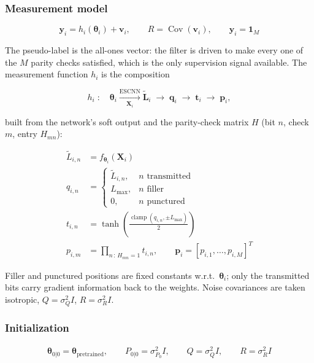 \documentclass{article}
\newcommand{\state}{\boldsymbol{\theta}}
\newcommand{\clamp}{\operatorname{clamp}}
\begin{document}
\subsubsection*{Measurement model}

\begin{equation}
\mathbf{y}_i = h_i(\state_i) + \mathbf{v}_i, \qquad R = \operatorname{Cov}(\mathbf{v}_i), \qquad
\mathbf{y}_i = \mathbf{1}_M
\end{equation}

The pseudo-label is the all-ones vector: the filter is driven to make every one of the $M$
parity checks satisfied, which is the only supervision signal available. The measurement
function $h_i$ is the composition

\begin{equation}
h_i \; : \quad \state_i \xrightarrow[\mathbf{X}_i]{\text{ESCNN}} \widetilde{\mathbf{L}}_i
\;\to\; \mathbf{q}_i \;\to\; \mathbf{t}_i \;\to\; \mathbf{p}_i ,
\end{equation}

built from the network's soft output and the parity-check matrix $H$ (bit $n$, check $m$,
entry $H_{mn}$):

\begin{align}
\widetilde{L}_{i,n} &= f_{\state_i}(\mathbf{X}_i) \label{eq:llr} \\[4pt]
q_{i,n} &=
\begin{cases}
\widetilde{L}_{i,n}, & n \text{ transmitted} \\
L_{\max}, & n \text{ filler} \\
0, & n \text{ punctured}
\end{cases} \\[4pt]
t_{i,n} &= \tanh\!\left(\frac{\clamp(q_{i,n}, \pm L_{\max})}{2}\right) \label{eq:t} \\[4pt]
p_{i,m} &= \prod_{n \,:\, H_{mn}=1} t_{i,n}, \qquad
\mathbf{p}_i = [p_{i,1}, \dots, p_{i,M}]^T \label{eq:p}
\end{align}

Filler and punctured positions are fixed constants w.r.t.\ $\state_i$; only the transmitted
bits carry gradient information back to the weights. Noise covariances are taken isotropic,
$Q = \sigma_Q^2 I$, $R = \sigma_R^2 I$.

\subsubsection*{Initialization}

\begin{equation}
\hat{\state}_{0|0} = \state_{\text{pretrained}}, \qquad
P_{0|0} = \sigma_{P_0}^2 I, \qquad
Q = \sigma_Q^2 I, \qquad
R = \sigma_R^2 I
\end{equation}
\end{document}
